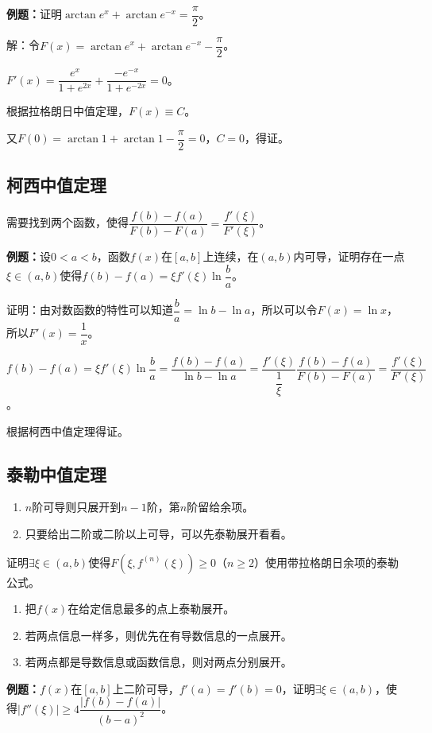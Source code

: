 \textbf{例题：}证明$\arctan e^x+\arctan e^{-x}=\dfrac{\pi}{2}$。

解：令$F(x)=\arctan e^x+\arctan e^{-x}-\dfrac{\pi}{2}$。

$F'(x)=\dfrac{e^x}{1+e^{2x}}+\dfrac{-e^{-x}}{1+e^{-2x}}=0$。

根据拉格朗日中值定理，$F(x)\equiv C$。

又$F(0)=\arctan 1+\arctan 1-\dfrac{\pi}{2}=0$，$C=0$，得证。

\subsection{柯西中值定理}

需要找到两个函数，使得$\dfrac{f(b)-f(a)}{F(b)-F(a)}=\dfrac{f'(\xi)}{F'(\xi)}$。

\textbf{例题：}设$0<a<b$，函数$f(x)$在$[a,b]$上连续，在$(a,b)$内可导，证明存在一点$\xi\in(a,b)$使得$f(b)-f(a)=\xi f'(\xi)\ln\dfrac{b}{a}$。

证明：由对数函数的特性可以知道$\dfrac{b}{a}=\ln b-\ln a$，所以可以令$F(x)=\ln x$，所以$F'(x)=\dfrac{1}{x}$。

$f(b)-f(a)=\xi f'(\xi)\ln\dfrac{b}{a}=\dfrac{f(b)-f(a)}{\ln b-\ln a}=\dfrac{f'(\xi)}{\dfrac{1}{\xi}}\dfrac{f(b)-f(a)}{F(b)-F(a)}=\dfrac{f'(\xi)}{F'(\xi)}$。

根据柯西中值定理得证。

\subsection{泰勒中值定理}

\begin{enumerate}
    \item $n$阶可导则只展开到$n-1$阶，第$n$阶留给余项。
    \item 只要给出二阶或二阶以上可导，可以先泰勒展开看看。
\end{enumerate}

证明$\exists\xi\in(a,b)$使得$F(\xi,f^{(n)}(\xi))\geqslant0$（$n\geqslant2$）使用带拉格朗日余项的泰勒公式。

\begin{enumerate}
    \item 把$f(x)$在给定信息最多的点上泰勒展开。
    \item 若两点信息一样多，则优先在有导数信息的一点展开。
    \item 若两点都是导数信息或函数信息，则对两点分别展开。
\end{enumerate}

\textbf{例题：}$f(x)$在$[a,b]$上二阶可导，$f'(a)=f'(b)=0$，证明$\exists\xi\in(a,b)$，使得$\vert f''(\xi)\vert\geqslant4\dfrac{\vert f(b)-f(a)\vert}{(b-a)^2}$。

